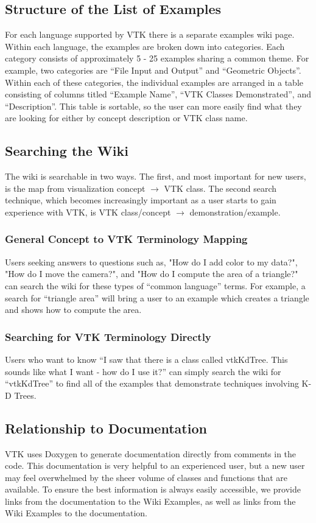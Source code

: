 \documentclass[a4paper,10pt]{IEEEtran}
\begin{document}
\subsection{Structure of the List of Examples}
For each language supported by VTK there is a separate examples wiki page. Within each language, the examples are broken down into categories. Each category consists of approximately 5 - 25 examples sharing a common theme. For example, two categories are ``File Input and Output'' and ``Geometric Objects''. Within each of these categories, the individual examples are arranged in a table consisting of columns titled ``Example Name'', ``VTK Classes Demonstrated'', and ``Description''. This table is sortable, so the user can more easily find what they are looking for either by concept description or VTK class name.

\subsection{Searching the Wiki}
The wiki is searchable in two ways. The first, and most important for new users, is the map from visualization concept $\rightarrow$ VTK class. The second search technique, which becomes increasingly important as a user starts to gain experience with VTK, is VTK class/concept $\rightarrow$ demonstration/example.
\subsubsection{General Concept to VTK Terminology Mapping}
Users seeking answers to questions such as, "How do I add color to my data?", "How do I move the camera?", and "How do I compute the area of a triangle?" can search the wiki for these types of ``common language'' terms. For example, a search for ``triangle area'' will bring a user to an example which creates a triangle and shows how to compute the area.
\subsubsection{Searching for VTK Terminology Directly}
Users who want to know ``I saw that there is a class called vtkKdTree. This sounds like what I want - how do I use it?'' can simply search the wiki for ``vtkKdTree'' to find all of the examples that demonstrate techniques involving K-D Trees.

\subsection{Relationship to Documentation}
VTK uses Doxygen to generate documentation directly from comments in the code. This documentation is very helpful to an experienced user, but a new user may feel overwhelmed by the sheer volume of classes and functions that are available. To ensure the best information is always easily accessible, we provide links from the documentation to the Wiki Examples, as well as links from the Wiki Examples to the documentation.
\end{document}
